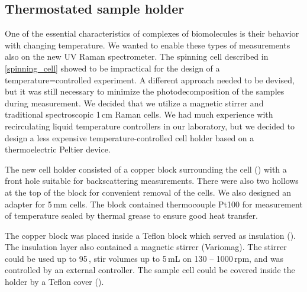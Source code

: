 \subsection{Thermostated sample holder}

One of the essential characteristics of complexes of biomolecules is their
behavior with changing temperature.
We wanted to enable these types of measurements also on the new UV Raman
spectrometer.
The spinning cell described in
\cref{spinning_cell}
showed to be impractical for the design of a temperature=controlled experiment.
A different approach needed to be devised, but it was still necessary to
minimize the photodecomposition of the samples during measurement.
We decided that we utilize a magnetic stirrer and traditional spectroscopic
1\,cm Raman cells.
We had much experience with recirculating liquid temperature controllers in our
laboratory, but we decided to design a less expensive temperature-controlled
cell holder based on a thermoelectric Peltier device.

The new cell holder consisted of a copper block surrounding the cell
()
with a front hole suitable for backscattering measurements.
There were also two hollows at the top of the block for convenient removal of
the cells.
We also designed an adapter for 5\,mm cells.
The block contained thermocouple Pt100 for measurement of temperature sealed by
thermal grease to ensure good heat transfer.

The copper block was placed inside a Teflon block which served as insulation
().
The insulation layer also contained a magnetic stirrer (Variomag).
The stirrer could be used up to 95\,\textcelsius{}, stir volumes up to 5\,mL on
130 -- 1000\,rpm, and was controlled by an external controller.
The sample cell could be covered inside the holder by a Teflon cover
().

\begin{figure}
	\centering
	\caption[%
		Thermostated cell holder copper core.%
	]{%
	}
	\label{\figlabel{thermostated_holder:core_drawing}}
\end{figure}


